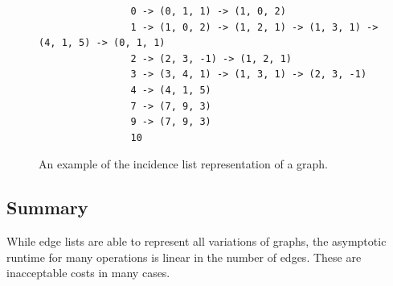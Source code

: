             \begin{figure}[htp]
            \begin{center}
            \begin{verbatim}
                0 -> (0, 1, 1) -> (1, 0, 2)
                1 -> (1, 0, 2) -> (1, 2, 1) -> (1, 3, 1) -> (4, 1, 5) -> (0, 1, 1)
                2 -> (2, 3, -1) -> (1, 2, 1)
                3 -> (3, 4, 1) -> (1, 3, 1) -> (2, 3, -1)
                4 -> (4, 1, 5)
                7 -> (7, 9, 3)
                9 -> (7, 9, 3)
                10
            \end{verbatim}
            \end{center}
            \caption{An example of the incidence list representation of a graph.}
            \label{incidencel}
            \end{figure}
            
        
        
        \subsection*{Summary}
            While edge lists are able to represent all variations of graphs, the asymptotic runtime for many operations is linear in the number of edges. 
            These are inacceptable costs in many cases.
            
